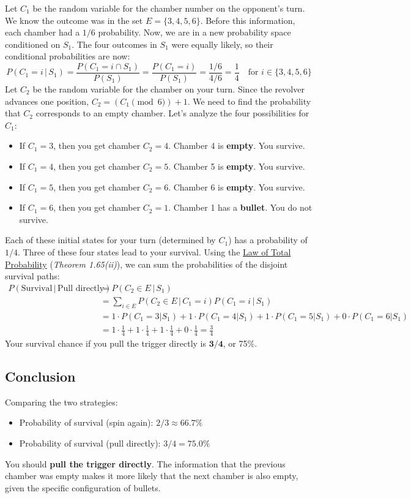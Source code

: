 \documentclass[11pt,a4paper]{article}
\theoremstyle{tutorstyle}
\newcommand{\concept}[2]{\hyperref[#1]{#2}}
\begin{document}
Let $C_1$ be the random variable for the chamber number on the opponent's turn. We know the outcome was in the set $E=\{3, 4, 5, 6\}$. Before this information, each chamber had a $1/6$ probability. Now, we are in a new probability space conditioned on $S_1$. The four outcomes in $S_1$ were equally likely, so their conditional probabilities are now:
\[
P(C_1=i \,|\, S_1) = \frac{P(C_1=i \cap S_1)}{P(S_1)} = \frac{P(C_1=i)}{P(S_1)} = \frac{1/6}{4/6} = \frac{1}{4} \quad \text{for } i \in \{3,4,5,6\}
\]
Let $C_2$ be the random variable for the chamber on your turn. Since the revolver advances one position, $C_2 = (C_1 \pmod 6) + 1$. We need to find the probability that $C_2$ corresponds to an empty chamber. Let's analyze the four possibilities for $C_1$:
\begin{itemize}[leftmargin=*]
    \item If $C_1 = 3$, then you get chamber $C_2 = 4$. Chamber 4 is \textbf{empty}. You survive.
    \item If $C_1 = 4$, then you get chamber $C_2 = 5$. Chamber 5 is \textbf{empty}. You survive.
    \item If $C_1 = 5$, then you get chamber $C_2 = 6$. Chamber 6 is \textbf{empty}. You survive.
    \item If $C_1 = 6$, then you get chamber $C_2 = 1$. Chamber 1 has a \textbf{bullet}. You do not survive.
\end{itemize}
Each of these initial states for your turn (determined by $C_1$) has a probability of $1/4$. Three of these four states lead to your survival. Using the \concept{concept_totalprob}{Law of Total Probability} (\textit{Theorem 1.65(ii)}), we can sum the probabilities of the disjoint survival paths:
\begin{align*}
P(\text{Survival} \,|\, \text{Pull directly}) &= P(C_2 \in E \,|\, S_1) \\
&= \sum_{i \in E} P(C_2 \in E \,|\, C_1=i) P(C_1=i \,|\, S_1) \\
&= 1 \cdot P(C_1=3|S_1) + 1 \cdot P(C_1=4|S_1) + 1 \cdot P(C_1=5|S_1) + 0 \cdot P(C_1=6|S_1) \\
&= 1 \cdot \frac{1}{4} + 1 \cdot \frac{1}{4} + 1 \cdot \frac{1}{4} + 0 \cdot \frac{1}{4} = \frac{3}{4}
\end{align*}
Your survival chance if you pull the trigger directly is $\mathbf{3/4}$, or 75\%.

\subsection{Conclusion}
Comparing the two strategies:
\begin{itemize}
    \item Probability of survival (spin again): $2/3 \approx 66.7\%$
    \item Probability of survival (pull directly): $3/4 = 75.0\%$
\end{itemize}
You should \textbf{pull the trigger directly}. The information that the previous chamber was empty makes it more likely that the next chamber is also empty, given the specific configuration of bullets.
\end{document}
